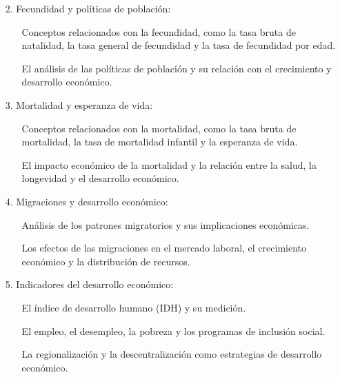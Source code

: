\documentclass[8pt,a4paper]{beamer}
\begin{document}
{\begin{frame}{}
\begin{enumerate}
\item[2.] Fecundidad y políticas de población:
\begin{itemize}
\item[\ding{65}] Conceptos relacionados con la fecundidad, como la tasa bruta de natalidad, la tasa general de fecundidad y la tasa de fecundidad por edad.
\item[\ding{65}] El análisis de las políticas de población y su relación con el crecimiento y desarrollo económico.
\end{itemize}
\item[3.] Mortalidad y esperanza de vida:
\begin{itemize}
\item[\ding{65}] Conceptos relacionados con la mortalidad, como la tasa bruta de mortalidad, la tasa de mortalidad infantil y la esperanza de vida.
\item[\ding{65}] El impacto económico de la mortalidad y la relación entre la salud, la longevidad y el desarrollo económico.
\end{itemize}
\item[4.] Migraciones y desarrollo económico:
\begin{itemize}
\item[\ding{65}] Análisis de los patrones migratorios y sus implicaciones económicas.
\item[\ding{65}] Los efectos de las migraciones en el mercado laboral, el crecimiento económico y la distribución de recursos.
\end{itemize}
\item[5.] Indicadores del desarrollo económico:
\begin{itemize}
\item[\ding{65}] El índice de desarrollo humano (IDH) y su medición.
\item[\ding{65}] El empleo, el desempleo, la pobreza y los programas de inclusión social.
\item[\ding{65}] La regionalización y la descentralización como estrategias de desarrollo económico.
\end{itemize}
\end{enumerate}

\end{frame}

}
\end{document}
